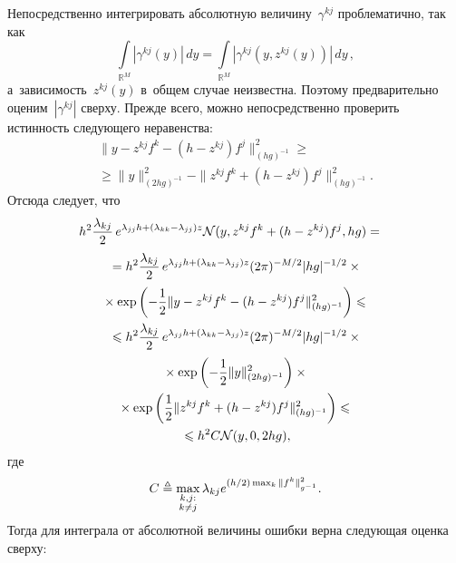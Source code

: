 \begin{multicols}{2}
 Непосредственно интегрировать абсолютную величину~$\gamma^{kj}$ 
 проблематично, так как
 $$
 \int\limits_{\mathbb{R}^M}|\gamma^{kj}(y)|\,dy= 
 \int\limits_{\mathbb{R}^M}|\gamma^{kj}(y, z^{kj}(y))|\,dy\,,
 $$ 
 а~зависимость~$z^{kj} (y)$ в~общем случае неизвестна. 
 Поэтому предварительно оценим~$|\gamma^{kj}|$ сверху. Прежде всего, 
 можно непосредственно проверить истинность следующего неравенства:
 \begin{multline}
 \| y - z^{kj}f^k-(h-z^{kj})f^j
 \|^2_{(hg)^{-1}} \geqslant{}\\
 {}\geqslant \|y\|^2_{(2hg)^{-1}} - \|z^{kj}f^k+(h-z^{kj})f^j\|^2_{(hg)^{-1}}.
 \label{eq:ineq_1}
 \end{multline}
 Отсюда следует, что
 \begin{multline}
 \hspace*{-3mm}h^2 \fr{\lambda_{kj}}{2}\,e^{\lambda_{jj}h+(\lambda_{kk}-\lambda_{jj})z}
 \mathcal{N}(y,z^{kj}f^k+(h-z^{kj})f^j,hg) ={} \hspace*{-1.51866pt}\\ 
 {}=
 h^2 \fr{\lambda_{kj}}{2}\,e^{\lambda_{jj}h+(\lambda_{kk}-\lambda_{jj})z}
 (2\pi)^{-M/2}|hg|^{-1/2} \times{}\\
 {}\times
 \exp  \left(
 -\fr{1}{2} \| y - z^{kj}f^k-(h-z^{kj})f^j
 \|^2_{(hg)^{-1}}
 \right) \leqslant {}\\ 
 {}\leqslant
  h^2 \fr{\lambda_{kj}}{2}\,e^{\lambda_{jj}h+(\lambda_{kk}-\lambda_{jj})z}
 (2\pi)^{-M/2}|hg|^{-1/2}\times{}\\
 {}\times
 \exp\left( 
 -\fr{1}{2}\|y\|^2_{(2hg)^{-1}}
 \right)
 \times{} \\ 
 {}\times
 \exp
 \left( 
 \fr{1}{2}\| z^{kj}f^k+(h-z^{kj})f^j \|^2_{(hg)^{-1}}
 \right) \leqslant{}\\
 {}\leqslant
  h^2C \mathcal{N}(y,0,2hg),
 \label{eq:gauss}
 \end{multline}
 где
 $$
 C \triangleq \max\limits_{\substack{{k,j:}\\
 {k \neq j}}}\lambda_{kj}e^{({h}/{2})\max_k\|f^k\|_{g^{-1}}^2}.
 $$
 Тогда для интеграла от абсолютной величины ошибки верна 
 следующая оценка сверху:
 

\end{multicols}
